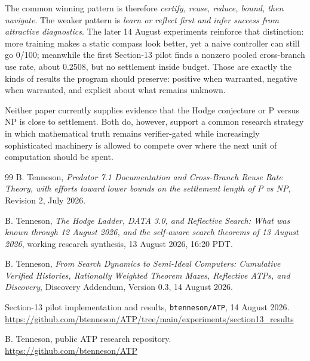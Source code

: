 \documentclass[11pt]{article}
\begin{document}
The common winning pattern is therefore \emph{certify, reuse, reduce, bound, then navigate}.  The weaker pattern is \emph{learn or reflect first and infer success from attractive diagnostics}.  The later 14 August experiments reinforce that distinction: more training makes a static compass look better, yet a naive controller can still go 0/100; meanwhile the first Section-13 pilot finds a nonzero pooled cross-branch use rate, about 0.2508, but no settlement inside budget.  Those are exactly the kinds of results the program should preserve: positive when warranted, negative when warranted, and explicit about what remains unknown.

Neither paper currently supplies evidence that the Hodge conjecture or P versus NP is close to settlement.  Both do, however, support a common research strategy in which mathematical truth remains verifier-gated while increasingly sophisticated machinery is allowed to compete over where the next unit of computation should be spent.

\begin{thebibliography}{99}
B. Tenneson, \emph{Predator 7.1 Documentation and Cross-Branch Reuse Rate Theory, with efforts toward lower bounds on the settlement length of P vs NP}, Revision 2, July 2026.

B. Tenneson, \emph{The Hodge Ladder, DATA 3.0, and Reflective Search: What was known through 12 August 2026, and the self-aware search theorems of 13 August 2026}, working research synthesis, 13 August 2026, 16:20 PDT.

B. Tenneson, \emph{From Search Dynamics to Semi-Ideal Computers: Cumulative Verified Histories, Rationally Weighted Theorem Mazes, Reflective ATPs, and Discovery}, Discovery Addendum, Version 0.3, 14 August 2026.

Section-13 pilot implementation and results, \texttt{btenneson/ATP}, 14 August 2026.\\
\url{https://github.com/btenneson/ATP/tree/main/experiments/section13_results}

B. Tenneson, public ATP research repository.\\
\url{https://github.com/btenneson/ATP}
\end{thebibliography}
\end{document}

